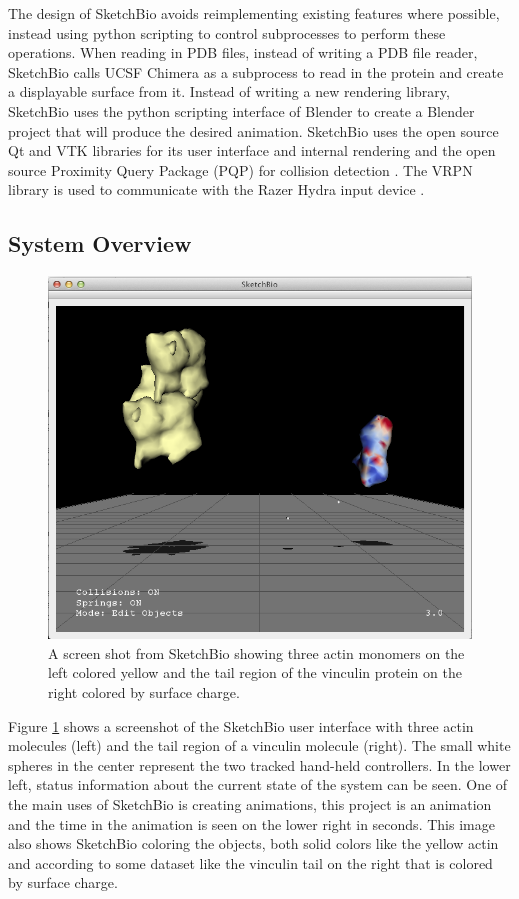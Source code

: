 \documentclass[twocolumn]{bmcart}%
\begin{document}
The design of SketchBio avoids reimplementing existing features where possible, instead using python scripting to control subprocesses to perform these operations.  When reading in PDB files, instead of writing a PDB file reader, SketchBio calls UCSF Chimera as a subprocess to read in the protein and create a displayable surface from it.  Instead of writing a new rendering library, SketchBio uses the python scripting interface of Blender to create a Blender project that will produce the desired animation.  SketchBio uses the open source Qt and VTK\cite{VTKbook} libraries for its user interface and internal rendering and the open source Proximity Query Package (PQP) for collision detection \cite{PQP}.  The VRPN library is used to communicate with the Razer Hydra input device \cite{taylor2001vrpn}.

\subsection*{System Overview}

\begin{figure}[t]
\centering
\includegraphics[width=0.8\columnwidth]{actinVinculin.png}
\caption{A screen shot from SketchBio showing three actin monomers on the left colored yellow and the tail region of the vinculin protein on the right colored by surface charge.}
\label{fig:actin_vinculin}
\end{figure}

Figure \ref{fig:actin_vinculin} shows a screenshot of the SketchBio user interface with three actin molecules (left) and the tail region of a vinculin molecule (right).  The small white spheres in the center represent the two tracked hand-held controllers.  In the lower left, status information about the current state of the system can be seen.  One of the main uses of SketchBio is creating animations, this project is an animation and the time in the animation is seen on the lower right in seconds.  This image also shows SketchBio coloring the objects, both solid colors like the yellow actin and according to some dataset like the vinculin tail on the right that is colored by surface charge.
\end{document}
